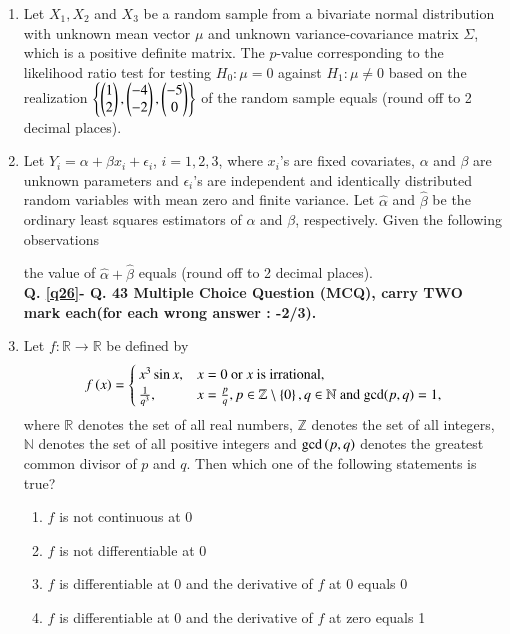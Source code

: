 \documentclass[journal]{IEEEtran}
\begin{document}
\begin{enumerate}
\item Let $X_1, X_2$ and $X_3$ be a random sample from a bivariate normal distribution with unknown mean vector $\mu$ and unknown variance-covariance matrix $\Sigma$, which is a positive definite matrix. The $p$-value corresponding to the likelihood ratio test for testing $H_0: \mu = 0$ against $H_1: \mu \neq 0$ based on the realization $\left\{ \begin{pmatrix} 1 \\ 2 \end{pmatrix}, \begin{pmatrix} -4 \\ -2 \end{pmatrix}, \begin{pmatrix} -5 \\ 0 \end{pmatrix}\right\}$  of the random sample equals \underline{\hspace{1cm}} (round off to 2 decimal places).

\item Let $Y_i = \alpha + \beta x_i + \epsilon_i$, $i = 1, 2, 3$, where $x_i$'s are fixed covariates, $\alpha$ and $\beta$ are unknown parameters and $\epsilon_i$'s are independent and identically distributed random variables with mean zero and finite variance. Let $\hat{\alpha}$ and $\hat{\beta}$ be the ordinary least squares estimators of $\alpha$ and $\beta$, respectively. Given the following observations
 \begin{table}[h!]
     \centering
     
 \end{table}
the value of $\hat{\alpha} + \hat{\beta}$ equals \underline{\hspace{1cm}} (round off to 2 decimal places).
\\ \textbf{ Q. \ref{q26}- Q. 43 Multiple Choice Question (MCQ), carry TWO mark each(for each wrong answer : -2/3).}
\item \label{q26} Let $f: \mathbb{R} \rightarrow \mathbb{R}$ be defined by
\begin{align*}
f\left(x\right) =
\begin{cases}
x^3 \sin x, & x = 0 \text{ or } x \text{ is irrational}, \\
\frac{1}{q^3}, & x = \frac{p}{q}, p \in \mathbb{Z} \setminus \left\{0\right\}, q \in \mathbb{N} \text{ and } \text{gcd}(p,q) = 1,
\end{cases}
\end{align*}
where $\mathbb{R}$ denotes the set of all real numbers, $\mathbb{Z}$ denotes the set of all integers, $\mathbb{N}$ denotes the set of all positive integers and $\text{gcd}\left(p, q\right)$ denotes the greatest common divisor of $p$ and $q$. Then which one of the following statements is true?

\begin{enumerate}
\item $f$ is not continuous at 0
\item $f$ is not differentiable at 0
\item $f$ is differentiable at 0 and the derivative of $f$ at 0 equals 0
\item $f$ is differentiable at 0 and the derivative of $f$ at zero equals 1
\end{enumerate}

 \end{enumerate}
 
\end{document}
